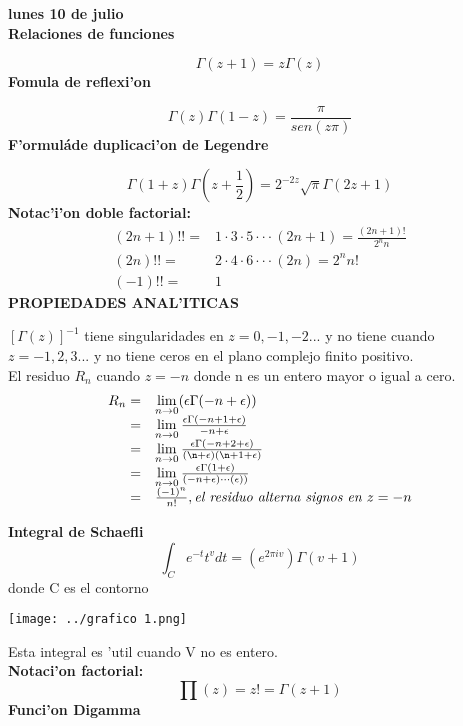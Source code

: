 \documentclass{article}
\theoremstyle{definition}
\begin{document}
\textbf{lunes 10 de julio}\\
\textbf{Relaciones de funciones}

\[\Gamma (z+1) = z\Gamma (z)\]
\textbf{Fomula de reflexi'on}

\[\Gamma (z)\Gamma (1-z) = \frac{\pi}{sen(z\pi)}\]
\textbf{F'ormuláde duplicaci'on de Legendre}

\[\Gamma (1+z)\Gamma (z+\frac{1}{2}) = 2^{-2z}\sqrt{\pi}\Gamma (2z+1) \]
\textbf{Notac'i'on doble factorial: }
\[
\begin{array}{rl}
	(2n+1)!!=& 1\cdot 3\cdot 5\cdot\cdot\cdot (2n+1)=\frac{(2n+1)!}{2^nn}\\
	(2n)!!=& 2\cdot 4\cdot 6\cdot\cdot\cdot (2n)=2^nn!\\
	(-1)!!=& 1
\end{array}
\]
\textbf{PROPIEDADES ANAL'ITICAS}

$[\Gamma (z)]^{-1}$ tiene singularidades en $z=0,-1,-2...$ y no tiene cuando  $z=-1,2,3...$ y no tiene ceros en el plano complejo finito positivo.\\
El residuo $R_n$ cuando $z=-n$ donde n es un entero mayor o igual a cero.\\
\[
\begin{array}{rl}
	R_n=&\lim\limits_{n\to 0} (\epsilon\Gamma (-n+\epsilon))\\
	=& \lim\limits_{n\to 0} \frac{\epsilon\Gamma (-n+1+\epsilon)}{-n+\epsilon}\\


	=& \lim\limits_{n\to 0}\frac{\epsilon\Gamma (-n+2+\epsilon)}{(\n+\epsilon)(\n+1+\epsilon)}\\
	=&\lim\limits_{n\to 0} \frac{\epsilon\Gamma (1+\epsilon)}{(-n+\epsilon)\cdot\cdot\cdot(\epsilon))}\\
	=& \frac{(-1)^n}{n!}, \textit{el residuo alterna signos en } z=-n
\end{array}
\]

\textbf{Integral de Schaefli}
\[\int_Ce^{-t}t^vdt=(e^{2\pi iv})\Gamma (v+1)\]
donde C es el contorno
\begin{center}
\texttt{[image: ../grafico 1.png]} 
\end{center}

Esta integral es 'util cuando V no es entero.\\
\textbf{Notaci'on factorial:}
\[\prod (z)=z!=\Gamma (z+1)\]
\textbf{Funci'on Digamma}
\end{document}
